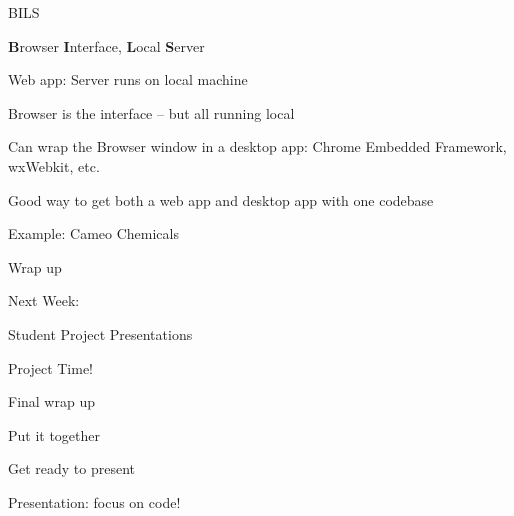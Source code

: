 \documentclass{beamer}
\begin{document}
\begin{frame}[fragile]{BILS}

\vfill
{\Large {\bf B}rowser {\bf I}nterface, {\bf L}ocal {\bf S}erver}
\vfill

\vfill
{\Large Web app: Server runs on local machine}
\vfill

\vfill
{\Large Browser is the interface -- but all running local}

\vfill
{\Large Can wrap the Browser window in a desktop app: Chrome Embedded Framework, wxWebkit, etc.}

\vfill
{\Large Good way to get both a web app and desktop app with one codebase}

\vfill
{\Large Example: Cameo Chemicals}

\end{frame}


\begin{frame}[fragile]{Wrap up}

\vfill
{\Large }
\vfill

\end{frame}

\begin{frame}{Next Week:}

\vfill
{\LARGE Student Project Presentations}

\vfill

\end{frame}

\begin{frame}[fragile]{Project Time!}

\vfill
\Large{Final wrap up}

\vfill
\Large{Put it together}

\vfill
\Large{Get ready to present}

\vfill
\Large{Presentation: focus on code!}

\end{frame}
\end{document}
